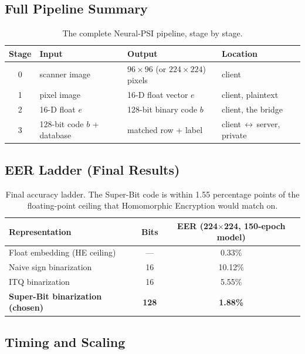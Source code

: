 \documentclass[11pt]{article}
\begin{document}
\subsection{Full Pipeline Summary}

\begin{table}[h]
\centering
\begin{tabular}{clll}
\toprule
Stage & Input & Output & Location \\
\midrule
0 & scanner image & $96\times96$ (or $224\times224$) pixels & client \\
1 & pixel image & 16-D float vector $e$ & client, plaintext \\
2 & 16-D float $e$ & 128-bit binary code $b$ & client, the bridge \\
3 & 128-bit code $b$ + database & matched row + label & client$\,\leftrightarrow\,$server, private \\
\bottomrule
\end{tabular}
\caption{The complete Neural-PSI pipeline, stage by stage.}
\end{table}

\subsection{EER Ladder (Final Results)}

\begin{table}[h]
\centering
\begin{tabular}{lcc}
\toprule
Representation & Bits & EER (224$\times$224, 150-epoch model) \\
\midrule
Float embedding (HE ceiling)  & ---  & 0.33\% \\
Naive sign binarization        & 16   & 10.12\% \\
ITQ binarization                & 16   & 5.55\% \\
\textbf{Super-Bit binarization (chosen)} & \textbf{128} & \textbf{1.88\%} \\
\bottomrule
\end{tabular}
\caption{Final accuracy ladder. The Super-Bit code is within 1.55 percentage points of the
floating-point ceiling that Homomorphic Encryption would match on.}
\end{table}

\subsection{Timing and Scaling}
\end{document}
